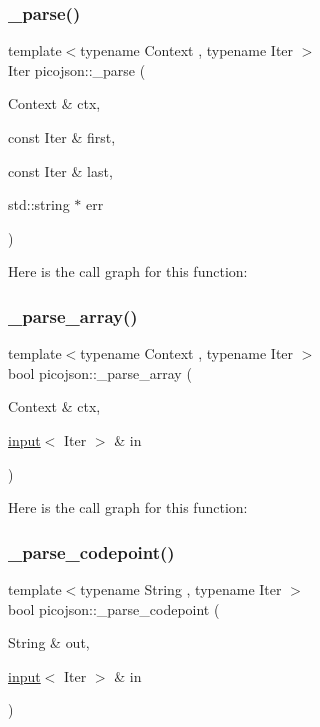 \subsubsection{\texorpdfstring{\+\_\+parse()}{\_parse()}\hspace{0.1cm}{\footnotesize\ttfamily [2/2]}}
{\footnotesize\ttfamily template$<$typename Context , typename Iter $>$ \\
Iter picojson\+::\+\_\+parse (\begin{DoxyParamCaption}\item[{Context \&}]{ctx,  }\item[{const Iter \&}]{first,  }\item[{const Iter \&}]{last,  }\item[{std\+::string $\ast$}]{err }\end{DoxyParamCaption})\hspace{0.3cm}{\ttfamily [inline]}}

Here is the call graph for this function\+:
\hypertarget{namespacepicojson_adcae039b132c6c96d2b2d9e786a04a88}{}\label{namespacepicojson_adcae039b132c6c96d2b2d9e786a04a88} 
\subsubsection{\texorpdfstring{\+\_\+parse\+\_\+array()}{\_parse\_array()}}
{\footnotesize\ttfamily template$<$typename Context , typename Iter $>$ \\
bool picojson\+::\+\_\+parse\+\_\+array (\begin{DoxyParamCaption}\item[{Context \&}]{ctx,  }\item[{\hyperlink{classpicojson_1_1input}{input}$<$ Iter $>$ \&}]{in }\end{DoxyParamCaption})\hspace{0.3cm}{\ttfamily [inline]}}

Here is the call graph for this function\+:
\hypertarget{namespacepicojson_a05316c2614f3e7a4559ce1d1003eb051}{}\label{namespacepicojson_a05316c2614f3e7a4559ce1d1003eb051} 
\subsubsection{\texorpdfstring{\+\_\+parse\+\_\+codepoint()}{\_parse\_codepoint()}}
{\footnotesize\ttfamily template$<$typename String , typename Iter $>$ \\
bool picojson\+::\+\_\+parse\+\_\+codepoint (\begin{DoxyParamCaption}\item[{String \&}]{out,  }\item[{\hyperlink{classpicojson_1_1input}{input}$<$ Iter $>$ \&}]{in }\end{DoxyParamCaption})\hspace{0.3cm}{\ttfamily [inline]}}


